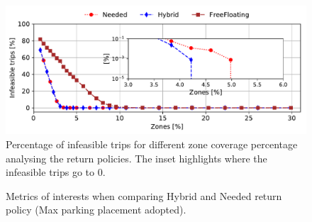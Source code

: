 \begin{figure}[ht]
	\centering
	\includegraphics[width=0.95\columnwidth]{figures/Torino_H_N_FF_deaths_probs.pdf}
	\caption{Percentage of infeasible trips for different zone coverage percentage analysing the return policies. The inset highlights where the infeasible trips go to 0.}
	\label{fig:deathsVsZones_policy}
\end{figure}

\begin{figure}[ht]
    \centering     
    
    \caption{Metrics of interests when comparing Hybrid and Needed return policy (Max parking placement adopted).}
    \label{}
\end{figure}

